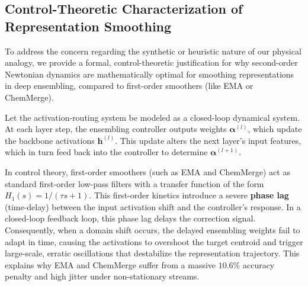 \subsection{Control-Theoretic Characterization of Representation Smoothing}
\label{sec:appendix_control_theoretic}
To address the concern regarding the synthetic or heuristic nature of our physical analogy, we provide a formal, control-theoretic justification for why second-order Newtonian dynamics are mathematically optimal for smoothing representations in deep ensembling, compared to first-order smoothers (like EMA or ChemMerge).

Let the activation-routing system be modeled as a closed-loop dynamical system. At each layer step, the ensembling controller outputs weights $\boldsymbol{\alpha}^{(l)}$, which update the backbone activations $\mathbf{h}^{(l)}$. This update alters the next layer's input features, which in turn feed back into the controller to determine $\boldsymbol{\alpha}^{(l+1)}$. 

In control theory, first-order smoothers (such as EMA and ChemMerge) act as standard first-order low-pass filters with a transfer function of the form $H_1(s) = 1 / (\tau s + 1)$. This first-order kinetics introduce a severe \textbf{phase lag} (time-delay) between the input activation shift and the controller's response. In a closed-loop feedback loop, this phase lag delays the correction signal. Consequently, when a domain shift occurs, the delayed ensembling weights fail to adapt in time, causing the activations to overshoot the target centroid and trigger large-scale, erratic oscillations that destabilize the representation trajectory. This explains why EMA and ChemMerge suffer from a massive $10.6\%$ accuracy penalty and high jitter under non-stationary streams.

